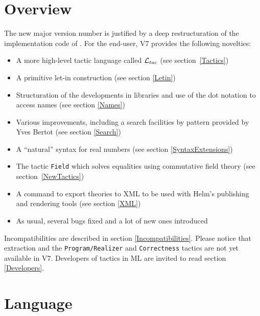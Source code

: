 \documentclass[11pt]{article}
\begin{document}


\def\ltac{{\cal L}_{tac}}

\section*{Overview}

The new major version number is justified by a deep restructuration of
the implementation code of \Coq. For the end-user, {\Coq}
V7 provides the following novelties:

\begin{itemize}
\item A more high-level tactic language called $\ltac$ (see
section~\ref{Tactics})
\item A primitive let-in construction (see section \ref{Letin})
\item Structuration of the developments in libraries and use of the
dot notation to access names (see section \ref{Names})
\item Various improvements, including a search facilities by pattern
provided by Yves Bertot (see section \ref{Search})
\item A ``natural'' syntax for real numbers (see section
\ref{SyntaxExtensions}) 
\item The tactic {\tt Field} which solves equalities using commutative field
theory (see section~\ref{NewTactics})
\item A command to export theories to XML to
be used with Helm's publishing and rendering tools (see section \ref{XML})
\item As usual, several bugs fixed and a lot of new ones introduced
\end{itemize}

Incompatibilities are described in section
\ref{Incompatibilities}. Please notice that extraction and the
{\tt Program/Realizer} and {\tt Correctness} tactics are not yet available in {\Coq} V7.
Developers of tactics in ML are invited to read section
\ref{Developers}.

\section{Language}
\end{document}
